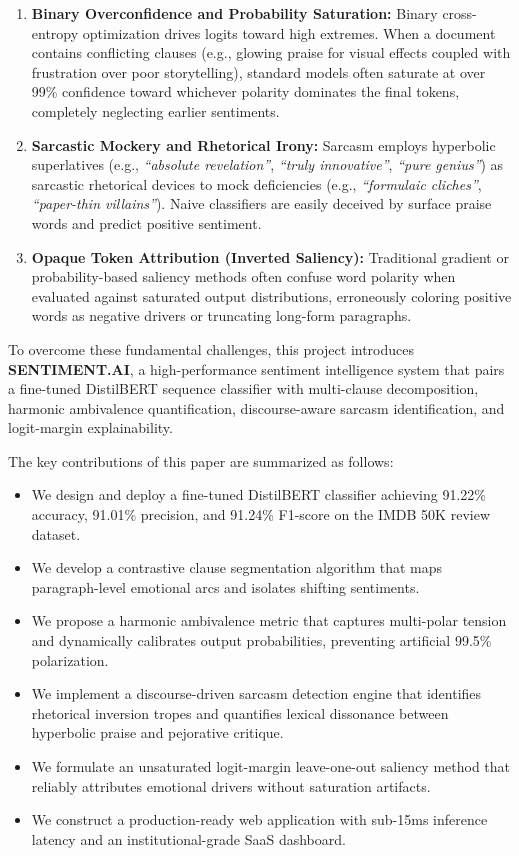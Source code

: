 \documentclass[conference]{IEEEtran}
\begin{document}
\begin{enumerate}
    \item \textbf{Binary Overconfidence and Probability Saturation:} Binary cross-entropy optimization drives logits toward high extremes. When a document contains conflicting clauses (e.g., glowing praise for visual effects coupled with frustration over poor storytelling), standard models often saturate at over 99\% confidence toward whichever polarity dominates the final tokens, completely neglecting earlier sentiments.
    \item \textbf{Sarcastic Mockery and Rhetorical Irony:} Sarcasm employs hyperbolic superlatives (e.g., \textit{``absolute revelation''}, \textit{``truly innovative''}, \textit{``pure genius''}) as sarcastic rhetorical devices to mock deficiencies (e.g., \textit{``formulaic cliches''}, \textit{``paper-thin villains''}). Naive classifiers are easily deceived by surface praise words and predict positive sentiment.
    \item \textbf{Opaque Token Attribution (Inverted Saliency):} Traditional gradient or probability-based saliency methods often confuse word polarity when evaluated against saturated output distributions, erroneously coloring positive words as negative drivers or truncating long-form paragraphs.
\end{enumerate}

To overcome these fundamental challenges, this project introduces \textbf{SENTIMENT.AI}, a high-performance sentiment intelligence system that pairs a fine-tuned DistilBERT sequence classifier with multi-clause decomposition, harmonic ambivalence quantification, discourse-aware sarcasm identification, and logit-margin explainability.

The key contributions of this paper are summarized as follows:
\begin{itemize}
    \item We design and deploy a fine-tuned DistilBERT classifier achieving 91.22\% accuracy, 91.01\% precision, and 91.24\% F1-score on the IMDB 50K review dataset.
    \item We develop a contrastive clause segmentation algorithm that maps paragraph-level emotional arcs and isolates shifting sentiments.
    \item We propose a harmonic ambivalence metric that captures multi-polar tension and dynamically calibrates output probabilities, preventing artificial 99.5\% polarization.
    \item We implement a discourse-driven sarcasm detection engine that identifies rhetorical inversion tropes and quantifies lexical dissonance between hyperbolic praise and pejorative critique.
    \item We formulate an unsaturated logit-margin leave-one-out saliency method that reliably attributes emotional drivers without saturation artifacts.
    \item We construct a production-ready web application with sub-15ms inference latency and an institutional-grade SaaS dashboard.
\end{itemize}
\end{document}
